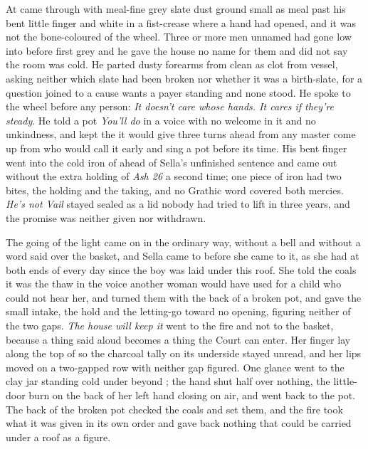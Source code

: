 At   came through  with meal-fine grey slate dust ground small as meal past his bent little finger and white in a fist-crease where a hand had opened, and it was not the bone-coloured  of the wheel. Three or more men unnamed had gone low into  before first grey and he gave the house no name for them and did not say the room was cold. He parted dusty forearms from clean as clot from vessel, asking neither which slate had been broken nor whether it was a birth-slate, for a question joined to a cause wants a payer standing and none stood. He spoke to the wheel before any person: \emph{It doesn't care whose hands. It cares if they're steady}. He told a pot \emph{You'll do} in a voice with no welcome in it and no unkindness, and kept the  it would give three turns ahead from any master come up from  who would call it early and sing a pot before its time. His bent finger went into the cold iron of  ahead of Sella's unfinished sentence and came out without the extra holding of \emph{Ash 26} a second time; one piece of iron had two bites, the holding and the taking, and no Grathic word covered both mercies. \emph{He's not Vail} stayed sealed as a lid nobody had tried to lift in three years, and the promise was neither given nor withdrawn.

\scenebreak

The going of the light came on in the ordinary way, without a bell and without a word said over the basket, and Sella came to  before she came to it, as she had at both ends of every day since the boy was laid under this roof. She told the coals it was the thaw in the voice another woman would have used for a child who could not hear her, and turned them with the back of a broken pot, and gave the small intake, the hold and the letting-go toward no opening, figuring neither of the two gaps. \emph{The house will keep it} went to the fire and not to the basket, because a thing said aloud becomes a thing the Court can enter. Her finger lay along the top of  so the charcoal tally on its underside stayed unread, and her lips moved on a two-gapped row with neither gap figured. One glance went to the clay jar standing cold under  beyond ; the hand shut half over nothing, the little-door burn on the back of her left hand closing on air, and went back to the pot. The back of the broken pot checked the coals and set them, and the fire took what it was given in its own order and gave back nothing that could be carried under a roof as a figure.

